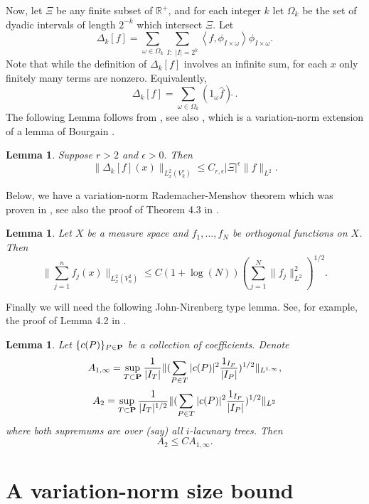 \documentclass[12pt]{amsart}
\numberwithin{equation}{section}
\newcommand {\rea}{\mathbb{R}}
\def\P{{\bf P}}
\def\<{\left<}
\def\>{\right>}
\newtheorem{lemma}[theorem]{Lemma}
\begin{document}
Now, let $\Xi$ be any finite subset of $\rea^+$, and for each integer $k$ let $\Omega_k$ be the set of dyadic intervals of length $2^{-k}$ which intersect $\Xi.$ Let
\begin{equation}\label{mfprojection}
\Delta_k[f] = \sum_{\omega \in \Omega_k} \sum_{I : \,\, |I| = 2^k} \<f,\phi_{I \times \omega}\>\phi_{I \times \omega}.
\end{equation}
Note that while the definition of $\Delta_k[f]$ involves an infinite sum, for each $x$ only finitely many terms are nonzero. Equivalently,
\[
\Delta_k[f] = \sum_{\omega \in \Omega_k} (1_{\omega} \hat{f})\check{\ }.
\]
The following Lemma follows from \cite[Lemma 9.2]{oberlin11awm}, see also \cite{nazarov10czd}, which is a variation-norm extension of a lemma of Bourgain \cite{bourgain89pes}.
\begin{lemma} \label{vblemma}
Suppose $r > 2$ and $\epsilon > 0.$ Then
\[
\|\Delta_k[f](x)\|_{L^2_x(V^r_k)} \leq C_{r,\epsilon} |\Xi|^{\epsilon} \|f\|_{L^2}.
\]
\end{lemma}

Below, we have a variation-norm Rademacher-Menshov theorem which was proven in \cite{lewko12esv}, see also the proof of Theorem 4.3 in \cite{nazarov10czd}.
\begin{lemma} \label{vnrmlemma}
Let $X$ be a measure space and $f_1, \ldots, f_N$ be orthogonal functions on $X$. Then
\[
\|\sum_{j = 1}^n f_j(x)\|_{L^2_x(V^2_n)} \leq C (1 + \log(N)) (\sum_{j = 1}^{N}\|f_j\|^2_{L^2})^{1/2}.
\]
\end{lemma}

Finally we will need the following John-Nirenberg type lemma. See, for example, the proof of Lemma 4.2 in \cite{muscalu04leb}.

\begin{lemma} \label{jnlemma}
Let $\{c(P)\}_{P \in \P}$ be a collection of coefficients. Denote
\[
A_{1,\infty} = \sup_{T \subset \P} \frac{1}{|I_T|}\|(\sum_{P \in T}|c(P)|^2\frac{1_{I_P}}{|I_P|})^{1/2}\|_{L^{1,\infty}},
\]
\[
A_2 = \sup_{T \subset \P} \frac{1}{|I_T|^{1/2}}\|(\sum_{P \in T}|c(P)|^2\frac{1_{I_P}}{|I_P|})^{1/2}\|_{L^{2}}
\]
where both supremums are over (say) all $i$-lacunary trees. Then
\begin{equation} \label{jnconc}
A_2 \leq C A_{1,\infty}.
\end{equation}
\end{lemma}

\section{A variation-norm size bound} \label{sbsection}
\end{document}
